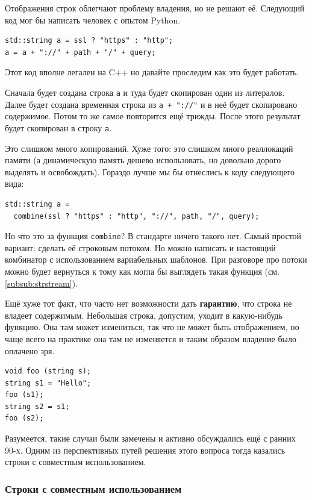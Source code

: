 \documentclass[a4paper,12pt,oneside]{article}
\begin{document}
Отображения строк облегчают проблему владения, но не решают её. Следующий код мог бы написать человек с опытом Python.

\begin{lstlisting}
std::string a = ssl ? "https" : "http";
a = a + "://" + path + "/" + query;
\end{lstlisting}

Этот код вполне легален на C++ но давайте проследим как это будет работать.

Сначала будет создана строка \lstinline!a! и туда будет скопирован один из литералов. Далее будет создана временная строка из \lstinline!a + "://"! и в неё будет скопировано содержимое. Потом то же самое повторится ещё трижды. После этого результат будет скопирован в строку \lstinline!a!.

Это слишком много копирований. Хуже того: это слишком много реаллокаций памяти (а динамическую память дешево использовать, но довольно дорого выделять и освобождать). Гораздо лучше мы бы отнеслись к коду следующего вида:

\begin{lstlisting}
std::string a = 
  combine(ssl ? "https" : "http", "://", path, "/", query);
\end{lstlisting}

Но что это за функция \lstinline!combine!? В стандарте ничего такого нет. Самый простой вариант: сделать её строковым потоком. Но можно написать и настоящий комбинатор с использованием вариабельных шаблонов. При разговоре про потоки можно будет вернуться к тому как могла бы выглядеть такая функция (см. \ref{subsub:strstream}).

Ещё хуже тот факт, что часто нет возможности дать \textbf{гарантию}, что строка не владеет содержимым. Небольшая строка, допустим, уходит в какую-нибудь функцию. Она там может измениться, так что не может быть отображением, но чаще всего на практике она там не изменяется и таким образом владение было оплачено зря.

\begin{lstlisting}
void foo (string s);
string s1 = "Hello";
foo (s1);
string s2 = s1;
foo (s2);
\end{lstlisting}

Разумеется, такие случаи были замечены и активно обсуждались ещё с ранних 90-х. Одним из перспективных путей решения этого вопроса тогда казались строки с совместным использованием.

\subsubsection{Строки с совместным использованием}\label{subsub:cow}
\end{document}
